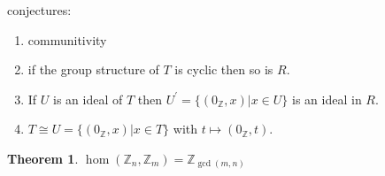 \documentclass[11pt,largemargins]{homework}
\newcommand{\Z}{\mathbb{Z}}
\newtheorem{theorem}{Theorem}
\begin{document}
conjectures:
\begin{enumerate}
    \item communitivity
    \item if the group structure of $T$ is cyclic then so is $R$. 
    \item If $U$ is an ideal of $T$ then $U^\prime = \{ (0_\Z, x) | x \in U \} $ is an ideal in $R$.
    \item $T \cong U = \{(0_\Z, x)|x \in T \}$ with $t \mapsto (0_\Z, t)$. 
   
\end{enumerate}

\begin{theorem}
    $\hom(\Z_n, \Z_m) = \Z_{\gcd(m, n)}$
\end{theorem}
\end{document}
